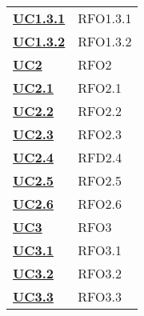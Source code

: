 \begin{longtable}[H]{| >{\centering\bfseries}p{8cm} | >{\centering\arraybackslash}p{8cm} |}
    \hyperref[par:uc1.3.1]{UC1.3.1}  & RFO1.3.1                                                                  \\

    \hyperref[par:uc1.3.2]{UC1.3.2}  & RFO1.3.2                                                                  \\


    \hyperref[sub:uc2]{UC2}          & RFO2                                                                      \\

    \hyperref[ssub:uc2.1]{UC2.1}     & RFO2.1                                                                    \\

    \hyperref[ssub:uc2.2]{UC2.2}     & RFO2.2                                                                    \\

    \hyperref[ssub:uc2.3]{UC2.3}     & RFO2.3                                                                    \\

    \hyperref[ssub:uc2.4]{UC2.4}     & RFD2.4                                                                    \\

    \hyperref[ssub:uc2.5]{UC2.5}     & RFO2.5                                                                    \\

    \hyperref[ssub:uc2.6]{UC2.6}     & RFO2.6                                                                    \\



    \hyperref[sub:uc3]{UC3}          & RFO3                                                                      \\

    \hyperref[ssub:uc3.1]{UC3.1}     & RFO3.1                                                                    \\

    \hyperref[ssub:uc3.2]{UC3.2}     & RFO3.2                                                                    \\

    \hyperref[ssub:uc3.3]{UC3.3}     & RFO3.3                                                                    \\





\end{longtable}
